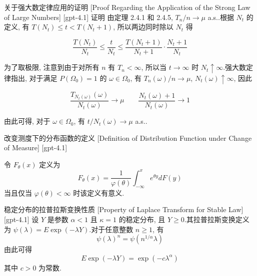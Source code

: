 \documentclass[UTF8]{ctexart}
\begin{document}
    
    
    \begin{prf}
        {关于强大数定律应用的证明}
        [Proof Regarding the Application of the Strong Law of Large Numbers]
        [gpt-4.1]
        证明 由定理 2.4.1 和 2.4.5, $T_{n} / n \to \mu$ a.s..根据 $N_{t}$ 的定义, 有 $T(N_{t}) \leq t < T(N_{t} + 1)$, 所以两边同时除以 $N_{t}$ 得

\[
\frac{T(N_{t})}{N_{t}} \leq \frac{t}{N_{t}} \leq \frac{T(N_{t} + 1)}{N_{t} + 1} \cdot \frac{N_{t} + 1}{N_{t}}
\]

为了取极限, 注意到由于对所有 $n$ 有 $T_{n} < \infty$, 所以当 $t \to \infty$ 时 $N_{t} \uparrow \infty$.强大数定律指出, 对于满足 $P(\Omega_{0}) = 1$ 的 $\omega \in \Omega_{0}$, 有 $T_{n}(\omega) / n \to \mu$, $N_{t}(\omega) \uparrow \infty$, 因此

\[
\frac{T_{N_{t}(\omega)}(\omega)}{N_{t}(\omega)} \to \mu \qquad \frac{N_{t}(\omega) + 1}{N_{t}(\omega)} \to 1
\]

由此可得, 对于 $\omega \in \Omega_{0}$, 有 $t / N_{t}(\omega) \to \mu$ a.s..

    \end{prf}
    
    
    
    \begin{dfn}
        {改变测度下的分布函数的定义}
        [Definition of Distribution Function under Change of Measure]
        [gpt-4.1]
        
令 $F_\theta(x)$ 定义为
\[
F_{ \theta }( x ) = \frac{ 1 }{ \varphi( \theta ) } \int_{ - \infty }^{ x } e^{ \theta y } dF( y )
\]
当且仅当 $\varphi( \theta ) < \infty$ 时该定义有意义.

    \end{dfn}
    
    
    
    \begin{ppt}
        {稳定分布的拉普拉斯变换性质}
        [Property of Laplace Transform for Stable Law]
        [gpt-4.1]
        设 $Y$ 是参数 $\alpha < 1$ 且 $\kappa = 1$ 的稳定分布, 且 $Y \geq 0$.其拉普拉斯变换定义为 $\psi ( \lambda ) = E \exp ( - \lambda Y )$.对于任意整数 $n \geq 1$, 有
\[
\psi ( \lambda ) ^ { n } = \psi ( n ^ { 1 / \alpha } \lambda )
\]
由此可得
\[
E \exp ( - \lambda Y ) = \exp ( - c \lambda ^ { \alpha } )
\]
其中 $c > 0$ 为常数.

    \end{ppt}
    
\end{document}
